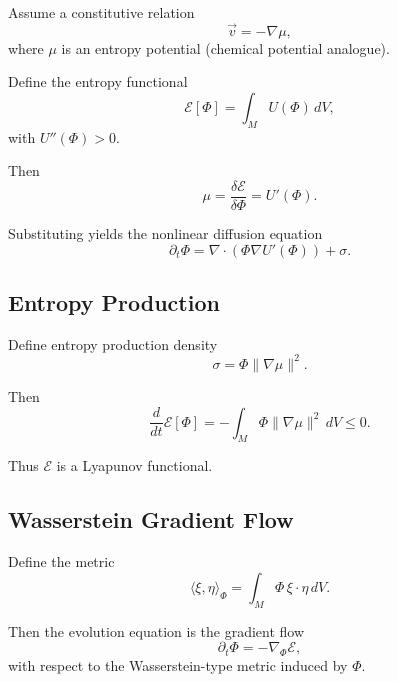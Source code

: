 \documentclass[11pt]{article}
\begin{document}
Assume a constitutive relation
\begin{equation}
\vec{v} = - \nabla \mu,
\end{equation}
where $\mu$ is an entropy potential (chemical potential analogue).

Define the entropy functional
\begin{equation}
\mathcal{E}[\Phi] = \int_M U(\Phi)\, dV,
\end{equation}
with $U''(\Phi) > 0$.

Then
\begin{equation}
\mu = \frac{\delta \mathcal{E}}{\delta \Phi} = U'(\Phi).
\end{equation}

Substituting yields the nonlinear diffusion equation
\begin{equation}
\partial_t \Phi
=
\nabla \cdot \left( \Phi \nabla U'(\Phi) \right) + \sigma.
\end{equation}

\subsection*{Entropy Production}

Define entropy production density
\begin{equation}
\sigma = \Phi \lVert \nabla \mu \rVert^2.
\end{equation}

Then
\begin{equation}
\frac{d}{dt} \mathcal{E}[\Phi]
=
- \int_M \Phi \lVert \nabla \mu \rVert^2 \, dV
\le 0.
\end{equation}

Thus $\mathcal{E}$ is a Lyapunov functional.

\subsection*{Wasserstein Gradient Flow}

Define the metric
\begin{equation}
\langle \xi, \eta \rangle_\Phi
=
\int_M \Phi \, \xi \cdot \eta \, dV.
\end{equation}

Then the evolution equation is the gradient flow
\begin{equation}
\partial_t \Phi
=
- \nabla_\Phi \mathcal{E},
\end{equation}
with respect to the Wasserstein-type metric induced by $\Phi$.
\end{document}
